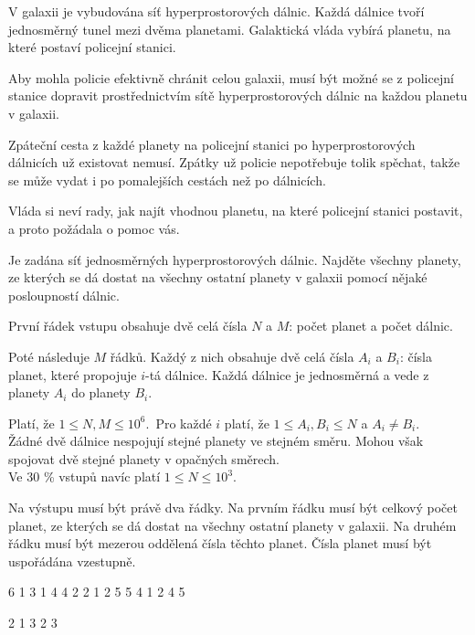 





V galaxii je vybudována síť hyperprostorových dálnic. Každá dálnice tvoří
jednosměrný tunel mezi dvěma planetami. Galaktická vláda vybírá planetu, na
které postaví policejní stanici.

Aby mohla policie efektivně chránit celou galaxii, musí být možné se z policejní
stanice dopravit prostřednictvím sítě hyperprostorových dálnic na každou planetu
v galaxii.

Zpáteční cesta z každé planety na policejní stanici po hyperprostorových
dálnicích už existovat nemusí. Zpátky už policie nepotřebuje tolik spěchat,
takže se může vydat i po pomalejších cestách než po dálnicích.

Vláda si neví rady, jak najít vhodnou planetu, na které policejní stanici
postavit, a proto požádala o pomoc vás.


Je zadána síť jednosměrných hyperprostorových dálnic. Najděte všechny planety,
ze kterých se dá dostat na všechny ostatní planety v galaxii pomocí nějaké
posloupností dálnic.


První řádek vstupu obsahuje dvě celá čísla $N$ a $M$: počet planet a počet
dálnic.

Poté následuje $M$ řádků. Každý z nich obsahuje dvě celá čísla $A_i$ a $B_i$:
čísla planet, které propojuje $i$-tá dálnice. Každá dálnice je jednosměrná a
vede z planety $A_i$ do planety $B_i$.

\bigskip
\noindent
Platí, že $1 \leq N, M \leq 10^6$.\
Pro každé $i$ platí, že $1 \leq A_i, B_i \leq N$ a $A_i \neq B_i$.\\
Žádné dvě dálnice nespojují stejné planety ve stejném směru. Mohou však spojovat
  dvě stejné planety v opačných směrech.\\
Ve 30 \% vstupů navíc platí $1 \leq N \leq 10^3$.


Na výstupu musí být právě dva řádky. Na prvním řádku musí být celkový počet
planet, ze kterých se dá dostat na všechny ostatní planety v galaxii. Na druhém
řádku musí být mezerou oddělená čísla těchto planet. Čísla planet musí být
uspořádána vzestupně.


 6
1 3
1 4
4 2
2 1
2 5
5 4
1 2 4 5
\sampleEND

 2
1 3
2 3
~
\sampleEND


